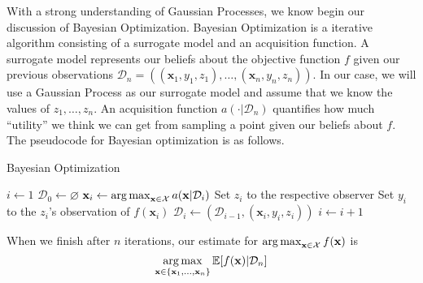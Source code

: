 With a strong understanding of Gaussian Processes, we know begin our discussion of Bayesian Optimization.
Bayesian Optimization is a iterative algorithm consisting of a surrogate model and an acquisition function.
A surrogate model represents our beliefs about the objective function $f$ given our previous observations $\mathcal{D}_n = ((\mathbf{x}_1, y_1, z_1), \ldots, (\mathbf{x}_n, y_n, z_n))$.
In our case, we will use a Gaussian Process as our surrogate model and assume that we know the values of $z_1, \ldots, z_n$.
An acquisition function $a( \cdot | \mathcal{D}_n)$
quantifies how much ``utility'' we think we can get from sampling a point given our beliefs about $f$.
The pseudocode for Bayesian optimization is as follows.

\begin{algorithm}
    \begin{algorithmic}
        \caption{Bayesian Optimization}\label{alg:bo}
        \State $i \gets 1$
        \State $\mathcal{D}_0 \gets \varnothing$
        \State $\mathbf{x}_i \gets \operatorname*{arg\,max}_{\mathbf{x} \in \mathcal{X}} a(\mathbf{x} | \mathcal{D}_i)$  
        \State Set $z_i$ to the respective observer
        \State Set $y_i$ to the $z_i$'s observation of $f(\mathbf{x}_i)$
        \State $\mathcal{D}_i \gets (\mathcal{D}_{i - 1}, (\mathbf{x}_i, y_i, z_i))$
        \State $i \gets i + 1$
        \EndWhile
    \end{algorithmic}
\end{algorithm}

When we finish after $n$ iterations, our estimate for $\operatorname*{arg\,max}_{\mathbf{x} \in \mathcal{X}}f(\mathbf{x})$ is
\begin{equation*}
    \operatorname*{arg\,max}_{\mathbf{x} \in \{ \mathbf{x}_1, \ldots, \mathbf{x}_n \} } \mathbb{E}[f(\mathbf{x}) | \mathcal{D}_n]
\end{equation*}


